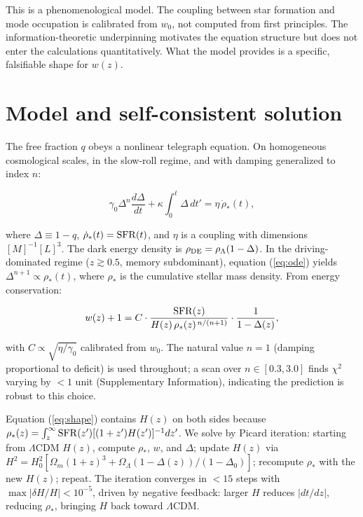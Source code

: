 \documentclass[12pt,a4paper]{article}
\begin{document}
This is a phenomenological model. The coupling between star formation and mode occupation is calibrated from $w_0$, not computed from first principles. The information-theoretic underpinning motivates the equation structure but does not enter the calculations quantitatively. What the model provides is a specific, falsifiable shape for $w(z)$.

\section*{Model and self-consistent solution}

The free fraction $q$ obeys a nonlinear telegraph equation. On homogeneous cosmological scales, in the slow-roll regime, and with damping generalized to index $n$:

\begin{equation}\label{eq:ode}
\gamma_0\Delta^n\frac{d\Delta}{dt} + \kappa\int_0^t\Delta\,dt' = \eta\,\dot{\rho}_*(t),
\end{equation}

where $\Delta\equiv1-q$, $\dot{\rho}_*(t)={\rm SFR}(t)$, and $\eta$ is a coupling with dimensions $[M]^{-1}[L]^{3}$. The dark energy density is $\rho_{\rm DE}=\rho_\Lambda(1-\Delta)$. In the driving-dominated regime ($z\gtrsim0.5$, memory subdominant), equation (\ref{eq:ode}) yields $\Delta^{n+1}\propto\rho_*(t)$, where $\rho_*$ is the cumulative stellar mass density. From energy conservation:

\begin{equation}\label{eq:shape}
w(z)+1 = C\cdot\frac{{\rm SFR}(z)}{H(z)\,\rho_*(z)^{\,n/(n+1)}}\cdot\frac{1}{1-\Delta(z)},
\end{equation}

with $C\propto\sqrt{\eta/\gamma_0}$ calibrated from $w_0$. The natural value $n=1$ (damping proportional to deficit) is used throughout; a scan over $n\in[0.3,3.0]$ finds $\chi^2$ varying by $<1$ unit (Supplementary Information), indicating the prediction is robust to this choice.

Equation (\ref{eq:shape}) contains $H(z)$ on both sides because $\rho_*(z)=\int_z^\infty{\rm SFR}(z')[(1+z')H(z')]^{-1}dz'$. We solve by Picard iteration: starting from $\Lambda$CDM $H(z)$, compute $\rho_*$, $w$, and $\Delta$; update $H(z)$ via $H^2=H_0^2[\Omega_m(1+z)^3+\Omega_\Lambda(1-\Delta(z))/(1-\Delta_0)]$; recompute $\rho_*$ with the new $H(z)$; repeat. The iteration converges in $<15$ steps with $\max|\delta H/H|<10^{-5}$, driven by negative feedback: larger $H$ reduces $|dt/dz|$, reducing $\rho_*$, bringing $H$ back toward $\Lambda$CDM.
\end{document}
